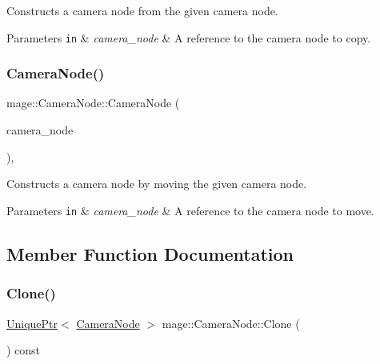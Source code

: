 Constructs a camera node from the given camera node.


\begin{DoxyParams}[1]{Parameters}
\mbox{\tt in}  & {\em camera\+\_\+node} & A reference to the camera node to copy. \\
\hline
\end{DoxyParams}
\hypertarget{classmage_1_1_camera_node_af46b911ecf12ed7c3cb31fb98a590fc1}{}\label{classmage_1_1_camera_node_af46b911ecf12ed7c3cb31fb98a590fc1} 
\subsubsection{\texorpdfstring{Camera\+Node()}{CameraNode()}\hspace{0.1cm}{\footnotesize\ttfamily [3/3]}}
{\footnotesize\ttfamily mage\+::\+Camera\+Node\+::\+Camera\+Node (\begin{DoxyParamCaption}\item[{\hyperlink{classmage_1_1_camera_node}{Camera\+Node} \&\&}]{camera\+\_\+node }\end{DoxyParamCaption})\hspace{0.3cm}{\ttfamily [protected]}, {\ttfamily [default]}}

Constructs a camera node by moving the given camera node.


\begin{DoxyParams}[1]{Parameters}
\mbox{\tt in}  & {\em camera\+\_\+node} & A reference to the camera node to move. \\
\hline
\end{DoxyParams}


\subsection{Member Function Documentation}
\hypertarget{classmage_1_1_camera_node_a6c636830efadf9753f2f0d012153d61f}{}\label{classmage_1_1_camera_node_a6c636830efadf9753f2f0d012153d61f} 
\subsubsection{\texorpdfstring{Clone()}{Clone()}}
{\footnotesize\ttfamily \hyperlink{namespacemage_a8c307fbcc33bce9b7f2aa4c26c3b95cf}{Unique\+Ptr}$<$ \hyperlink{classmage_1_1_camera_node}{Camera\+Node} $>$ mage\+::\+Camera\+Node\+::\+Clone (\begin{DoxyParamCaption}{ }\end{DoxyParamCaption}) const}

